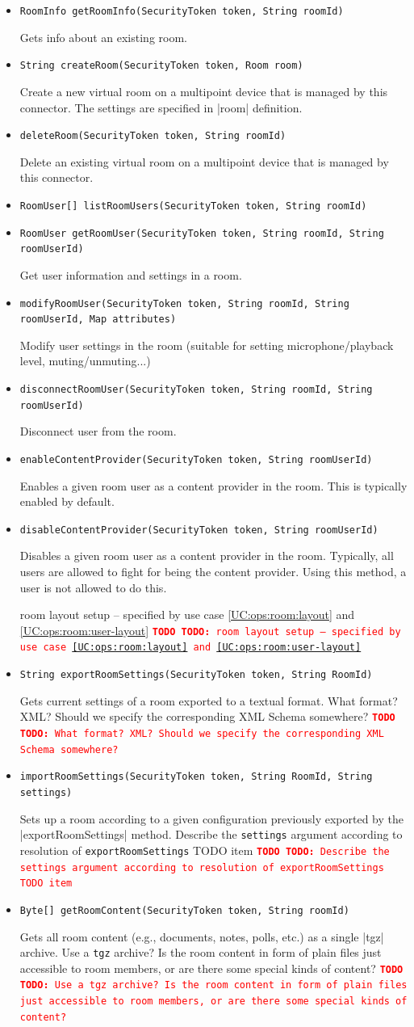 \documentclass[a4paper]{report}
\newenvironment{Api}{\begin{itemize}}{\end{itemize}}
\newcommand{\ApiCode}[1]{\lstinline[style=styleApi]|#1|}
\newcommand{\ApiItem}[1]{\item #1 %

}
\newcommand{\ApiCmd}[1]{\ApiItem{\ApiCode{#1}}}
\newcommand{\TODO}[1]{%
\def\empty{}%
\def\prvniparametr{#1}%
\ifx\prvniparametr\empty%
\begingroup\tt\textcolor{red}{\noindent\textbf{TODO}}\endgroup
\else%
\begingroup\tt\textcolor{red}{\noindent\textbf{TODO:}\ #1}\endgroup
\fi%
}
\begin{document}
\begin{Api}

\ApiCmd{RoomInfo getRoomInfo(SecurityToken token, String roomId)}
Gets info about an existing room.

\ApiCmd{String createRoom(SecurityToken token, Room room)}
Create a new virtual room on a multipoint device that is managed by this connector. The settings are specified in |room| definition.

\ApiCmd{deleteRoom(SecurityToken token, String roomId)}
Delete an existing virtual room on a multipoint device that is managed by this connector.

\ApiCmd{RoomUser[] listRoomUsers(SecurityToken token, String roomId)}

\ApiCmd{RoomUser getRoomUser(SecurityToken token, String roomId, String roomUserId)}
Get user information and settings in a room.

\ApiCmd{modifyRoomUser(SecurityToken token, String roomId, String roomUserId, Map attributes)}
Modify user settings in the room (suitable for setting
microphone/playback level, muting/unmuting...)

\ApiCmd{disconnectRoomUser(SecurityToken token, String roomId, String roomUserId)}
Disconnect user from the room.

\ApiCmd{enableContentProvider(SecurityToken token, String roomUserId)}
Enables a given room user as a content provider in the room. This is typically enabled by default.

\ApiCmd{disableContentProvider(SecurityToken token, String roomUserId)}
Disables a given room user as a content provider in the room. Typically, all users are allowed to fight for being the content provider. Using this method, a user is not allowed to do this.

\TODO{room layout setup -- specified by use case \ref{UC:ops:room:layout} and \ref{UC:ops:room:user-layout}}

\ApiCmd{String exportRoomSettings(SecurityToken token, String RoomId)}
Gets current settings of a room exported to a textual format.
\TODO{What format? XML? Should we specify the corresponding XML Schema somewhere?}

\ApiCmd{importRoomSettings(SecurityToken token, String RoomId, String settings)}
Sets up a room according to a given configuration previously exported by the |exportRoomSettings| method.
\TODO{Describe the \texttt{settings} argument according to resolution of \texttt{exportRoomSettings} TODO item}

\ApiCmd{Byte[] getRoomContent(SecurityToken token, String roomId)}
Gets all room content (e.g., documents, notes, polls, etc.) as a single |tgz| archive.
\TODO{Use a \texttt{tgz} archive? Is the room content in form of plain files just accessible to room members, or are there some special kinds of content?}


\end{Api}
\end{document}
